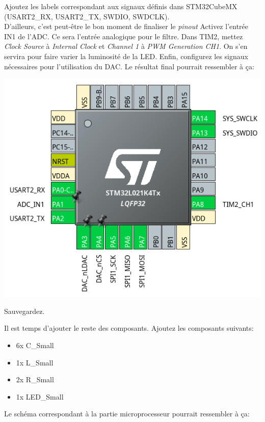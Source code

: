 \documentclass[12pt,%
addpoints,%
]{exam}
\begin{document}
\begin{questions}
	\question Ajoutez les labels correspondant aux signaux définis dans STM32CubeMX (USART2\_RX, USART2\_TX, SWDIO, SWDCLK). \\

		D'ailleurs, c'est peut-être le bon moment de finaliser le \emph{pinout}
	\question Activez l'entrée IN1 de l'ADC. Ce sera l'entrée analogique pour le filtre.
	\question Dans TIM2, mettez \emph{Clock Source} à \emph{Internal Clock} et \emph{Channel 1} à \emph{PWM Generation CH1}. 
		On s'en servira pour faire varier la luminosité de la LED.
	\question Enfin, configurez les signaux nécessaires pour l'utilisation du DAC.
		Le résultat final pourrait ressembler à ça:

	\begin{center}
        \includegraphics[width=.5\linewidth]{figures/cube01.png}
    \end{center}

		Sauvegardez.

\newpage

	\question Il est temps d'ajouter le reste des composants. Ajoutez les composants suivants:
	\begin{itemize}
		\item 6x C\_Small
		\item 1x L\_Small
		\item 2x R\_Small
		\item 1x LED\_Small\\
	\end{itemize}

		Le schéma correspondant à la partie microprocesseur pourrait ressembler à ça:


\end{questions}
\end{document}
